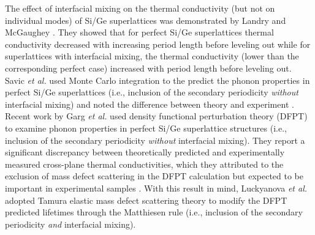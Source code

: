 The effect of interfacial mixing on the thermal conductivity (but not on individual modes) of Si/Ge superlattices was demonstrated by Landry and McGaughey \cite{PhysRevB.79.075316}. They showed that for perfect Si/Ge superlattices thermal conductivity decreased with increasing period length before leveling out while for superlattices with interfacial mixing, the thermal conductivity (lower than the corresponding perfect case) increased with period length before leveling out. Savic \textit{et al.} used Monte Carlo integration to the predict the phonon properties in perfect Si/Ge superlattices (i.e., inclusion of the secondary periodicity \textit{without} interfacial mixing) and noted the difference between theory and experiment \cite{savic:073113}. Recent work by Garg \textit{et al.} used density functional perturbation theory (DFPT) to examine phonon properties in perfect Si/Ge superlattice structures (i.e., inclusion of the secondary periodicity \textit{without} interfacial mixing). They report a significant discrepancy between theoretically predicted and experimentally measured cross-plane thermal conductivities, which they attributed to the exclusion of mass defect scattering in the DFPT calculation but expected to be important in experimental samples \cite{doi:10.1021/nl202186y}. With this result in mind, Luckyanova \textit{et al.} \cite{Luckyanova16112012} adopted Tamura elastic mass defect scattering theory \cite{tamura_isotope_1983} to modify the DFPT predicted lifetimes through the Matthiesen rule (i.e., inclusion of the secondary periodicity \textit{and} interfacial mixing).

